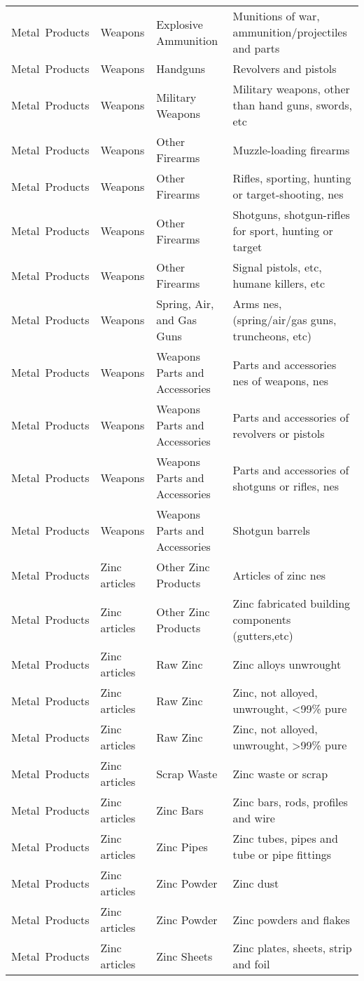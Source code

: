 \begin{appendices}
\begin{xltabular}{\textwidth}{|p{0.10\textwidth}|p{0.25\textwidth}|p{0.20\textwidth}|p{0.35\textwidth}|}
		Metal\ Products & Weapons & Explosive Ammunition & Munitions of war, ammunition/projectiles and parts \\
		Metal\ Products & Weapons & Handguns & Revolvers and pistols \\
		Metal\ Products & Weapons & Military Weapons & Military weapons, other than hand guns, swords, etc \\
		Metal\ Products & Weapons & Other Firearms & Muzzle-loading firearms \\
		Metal\ Products & Weapons & Other Firearms & Rifles, sporting, hunting or target-shooting, nes \\
		Metal\ Products & Weapons & Other Firearms & Shotguns, shotgun-rifles for sport, hunting or target \\
		Metal\ Products & Weapons & Other Firearms & Signal pistols, etc, humane killers, etc \\
		Metal\ Products & Weapons & Spring, Air, and Gas Guns & Arms nes, (spring/air/gas guns, truncheons, etc) \\
		Metal\ Products & Weapons & Weapons Parts and Accessories & Parts and accessories nes of weapons, nes \\
		Metal\ Products & Weapons & Weapons Parts and Accessories & Parts and accessories of revolvers or pistols \\
		Metal\ Products & Weapons & Weapons Parts and Accessories & Parts and accessories of shotguns or rifles, nes \\
		Metal\ Products & Weapons & Weapons Parts and Accessories & Shotgun barrels \\
		Metal\ Products & Zinc articles & Other Zinc Products & Articles of zinc nes \\
		Metal\ Products & Zinc articles & Other Zinc Products & Zinc fabricated building components (gutters,etc) \\
		Metal\ Products & Zinc articles & Raw Zinc & Zinc alloys unwrought \\
		Metal\ Products & Zinc articles & Raw Zinc & Zinc, not alloyed, unwrought, <99\% pure \\
		Metal\ Products & Zinc articles & Raw Zinc & Zinc, not alloyed, unwrought, >99\% pure \\
		Metal\ Products & Zinc articles & Scrap Waste & Zinc waste or scrap \\
		Metal\ Products & Zinc articles & Zinc Bars & Zinc bars, rods, profiles and wire \\
		Metal\ Products & Zinc articles & Zinc Pipes & Zinc tubes, pipes and tube or pipe fittings \\
		Metal\ Products & Zinc articles & Zinc Powder & Zinc dust \\
		Metal\ Products & Zinc articles & Zinc Powder & Zinc powders and flakes \\
		Metal\ Products & Zinc articles & Zinc Sheets & Zinc plates, sheets, strip and foil \\
	\end{xltabular}
	

\end{appendices}

